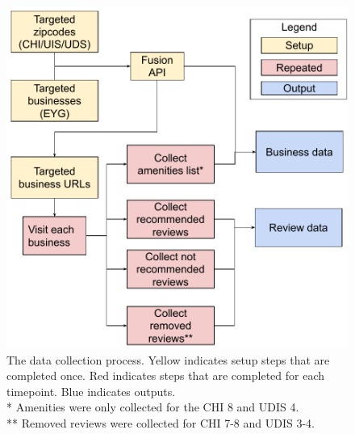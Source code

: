 \begin{figure}[b!]
    \centering
    \includegraphics[width=0.9\columnwidth]{figures/Crawl diagram.pdf}
    \caption{The data collection process. Yellow indicates setup steps that are completed once. Red indicates steps that are completed for each timepoint. Blue indicates outputs.\\
    * Amenities were only collected for the CHI 8 and UDIS 4.\\
    ** Removed reviews were collected for CHI 7-8 and UDIS 3-4. }
    \label{fig:crawling_diagram}
\end{figure}
